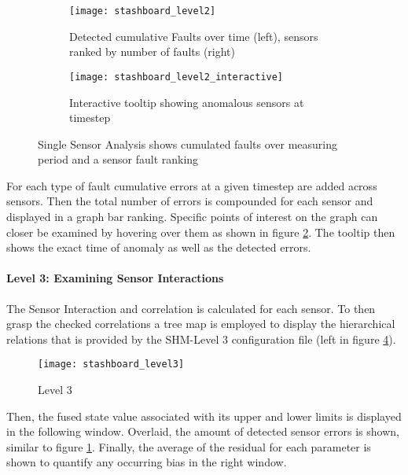 \begin{figure}[!h]
    \centering
    \begin{subfigure}[b]{1\textwidth}
        \centering
        \texttt{[image: stashboard\_level2]}
        \caption{Detected cumulative Faults over time (left), sensors ranked by number of faults (right)}
        \label{fig:stashboard_level2_clean}
    \end{subfigure}
    \begin{subfigure}[b]{1\textwidth}
        \centering
        \texttt{[image: stashboard\_level2\_interactive]}
        \caption{Interactive tooltip showing anomalous sensors at timestep}
        \label{fig:stashboard_level2_interactive}
    \end{subfigure}
    \caption{Single Sensor Analysis shows cumulated faults over measuring period and a sensor fault ranking}
    \label{fig:stashboard_level2}
\end{figure}

For each type of fault cumulative errors at a given timestep are added across sensors. Then the total number of errors is compounded for each sensor and displayed in a graph bar ranking.
Specific points of interest on the graph can closer be examined by hovering over them as shown in figure \ref{fig:stashboard_level2_interactive}. The tooltip then shows the exact time of anomaly as well as the detected errors.


\paragraph{Level 3: Examining Sensor Interactions}

The Sensor Interaction and correlation is calculated for each sensor. To then grasp the checked correlations a tree map is employed to display the hierarchical relations that is provided by the SHM-Level 3 configuration file (left in figure \ref{fig:stashboard_level3}).

\begin{figure}
    \centering
    \texttt{[image: stashboard\_level3]}
    \caption{Level 3}
    \label{fig:stashboard_level3}
\end{figure}

Then, the fused state value associated with its upper and lower limits is displayed in the following window. Overlaid, the amount of detected sensor errors is shown, similar to figure \ref{fig:stashboard_level2_clean}. Finally, the average of the residual for each parameter is shown to quantify any occurring bias in the right window.


